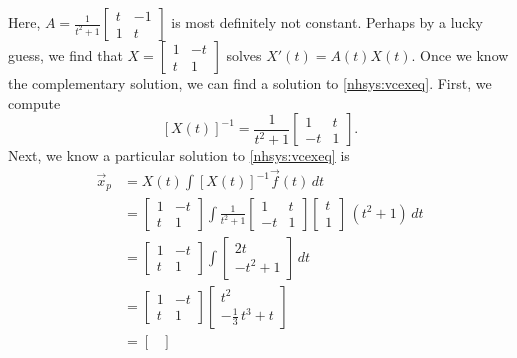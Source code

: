 \begin{example}
Here, $A = 
\frac{1}{t^2+1}
\left[ \begin{smallmatrix}
t & -1 \\
1 & t
\end{smallmatrix} \right]$ is most definitely not constant.
Perhaps by a lucky guess, we find that
$X = 
\left[ \begin{smallmatrix}
1 & -t \\
t & 1
\end{smallmatrix} \right]$ solves
$X'(t) = A(t) X(t)$.  Once we know the complementary solution, we can find
a solution to \eqref{nhsys:vcexeq}.  First, we compute
\begin{equation*}
\left[ X(t) \right]^{-1}
=
\frac{1}{t^2+1}
\begin{bmatrix}
1 & t \\
-t & 1
\end{bmatrix} .
\end{equation*}
Next, we know a particular solution to
\eqref{nhsys:vcexeq} is
\begin{equation*}
\begin{split}
\vec{x}_p & = 
X(t)
\int \left[X(t)\right]^{-1}\vec{f}(t) \, dt 
\\
& =
\begin{bmatrix}
1 & -t \\
t & 1
\end{bmatrix} 
\int
\frac{1}{t^2+1}
\begin{bmatrix}
1 & t \\
-t & 1
\end{bmatrix}
\begin{bmatrix} t \\ 1 \end{bmatrix} \,(t^2+1) 
\,dt
\\
& =
\begin{bmatrix}
1 & -t \\
t & 1
\end{bmatrix} 
\int
\begin{bmatrix}
2t \\
-t^2 + 1
\end{bmatrix} 
\,dt
\\
& =
\begin{bmatrix}
1 & -t \\
t & 1
\end{bmatrix} 
\begin{bmatrix}
t^2 \\
-\frac{1}{3}\,t^3 + t
\end{bmatrix} 
\\
& =
\begin{bmatrix}

\end{bmatrix}
\end{split}
\end{equation*}
\end{example}
